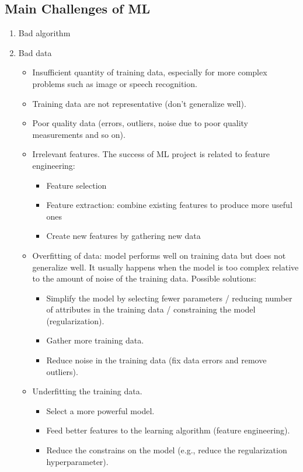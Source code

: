 \documentclass[12pt,oneside,a4paper]{article}
\numberwithin{equation}{section}
\begin{document}
\subsection{Main Challenges of ML}
\begin{enumerate}
\item Bad algorithm

\item Bad data 
\begin{itemize}
\item Insufficient quantity of training data, especially for more complex problems such as image or speech recognition.
\item Training data are not representative (don't generalize well).
\item Poor quality data (errors, outliers, noise due to poor quality measurements and so on).
\item Irrelevant features. The success of ML project is related to feature engineering: 
\begin{itemize}
\item Feature selection 
\item Feature extraction: combine existing features to produce more useful ones 
\item Create new features by gathering new data
\end{itemize}
\item Overfitting of data: model performs well on training data but does not generalize well. It usually happens when the model is too complex relative to the amount of noise of the training data. Possible solutions: 
\begin{itemize}
\item Simplify the model by selecting fewer parameters / reducing number of attributes in the training data / constraining the model (regularization).
\item Gather more training data. 
\item Reduce noise in the training data (fix data errors and remove outliers).
\end{itemize}
\item Underfitting the training data.
\begin{itemize}
\item Select a more powerful model. 
\item Feed better features to the learning algorithm (feature engineering).
\item Reduce the constrains on the model (e.g., reduce the regularization hyperparameter).
\end{itemize}
\end{itemize}
\end{enumerate}
\end{document}
